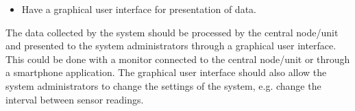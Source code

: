 \begin{itemize}
\item Have a graphical user interface for presentation of data.
\end{itemize}
The data collected by the system should be processed by the central node/unit and presented to the system administrators through a graphical user interface. This could be done with a monitor connected to the central node/unit or through a smartphone application. The graphical user interface should also allow the system administrators to change the settings of the system, e.g. change the interval between sensor readings.







